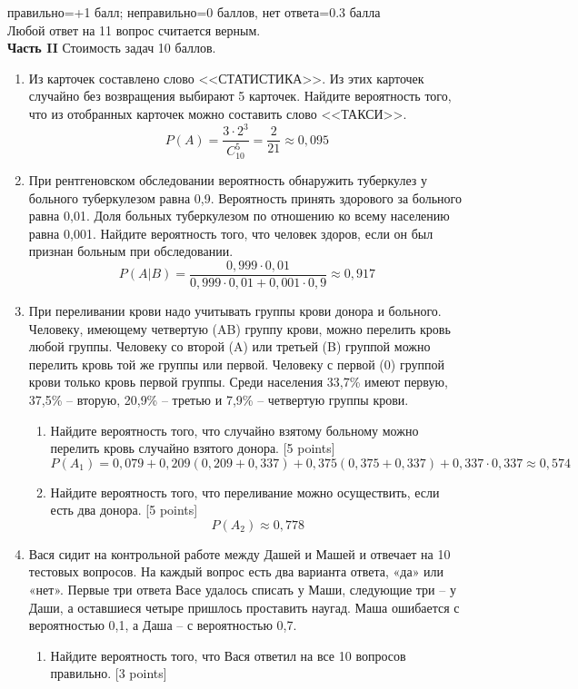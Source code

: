 \documentclass[pdftex,12pt,a4paper]{article}
\begin{document}
правильно=+1 балл; неправильно=0 баллов, нет ответа=0.3 балла \\
Любой ответ на 11 вопрос считается верным. \\

\pagebreak \textbf{Часть II} Стоимость задач 10 баллов. \\

\begin{enumerate}
\item Из карточек составлено слово <<СТАТИСТИКА>>. Из этих карточек случайно без возвращения  выбирают 5 карточек. Найдите вероятность того, что из отобранных карточек можно составить слово <<ТАКСИ>>.
\begin{equation}
P(A)=\frac{3\cdot 2^3}{C_{10}^{5}}=\frac{2}{21}\approx 0{,}095
\end{equation}

\item При рентгеновском обследовании вероятность обнаружить туберкулез у больного туберкулезом равна 0{,}9. Вероятность принять здорового за больного равна 0{,}01. Доля больных туберкулезом по отношению ко всему населению равна 0{,}001. Найдите вероятность того, что человек здоров, если он был признан больным при обследовании.
\begin{equation}
P(A|B)=\frac{0{,}999\cdot 0{,}01}{0{,}999\cdot 0{,}01+0{,}001\cdot 0{,}9}\approx 0{,}917
\end{equation}
\item При переливании крови надо учитывать группы крови донора и больного. Человеку, имеющему четвертую (AB) группу крови, можно перелить кровь любой группы. Человеку со второй (A) или третьей (B) группой можно перелить кровь той же группы или первой. Человеку с первой (0) группой крови только кровь первой группы. Среди населения 33{,}7\% имеют первую, 37{,}5\% – вторую, 20{,}9\% -- третью и 7{,}9\% – четвертую группы крови.
\begin{enumerate}
\item Найдите вероятность того, что случайно взятому больному можно перелить кровь случайно взятого донора. [5 points]
\begin{equation}
P(A_1)=0{,}079+0{,}209(0{,}209+0{,}337)+0{,}375(0{,}375+0{,}337)+0{,}337\cdot0{,}337\approx 0{,}574
\end{equation}
\item Найдите вероятность того, что переливание можно осуществить, если есть два донора. [5 points]
\begin{equation}
P(A_2)\approx 0{,}778
\end{equation}
\end{enumerate}
\item Вася сидит на контрольной работе между Дашей и Машей и отвечает на 10 тестовых вопросов. На каждый вопрос есть два варианта ответа, «да» или «нет». Первые три ответа Васе удалось списать у Маши, следующие три -- у Даши, а оставшиеся четыре пришлось проставить наугад. Маша ошибается с вероятностью 0{,}1, а Даша -- с вероятностью 0{,}7. 
\begin{enumerate}
\item Найдите вероятность того, что Вася ответил на все 10 вопросов правильно. [3 points]


\end{enumerate}
\end{enumerate}
\end{document}
